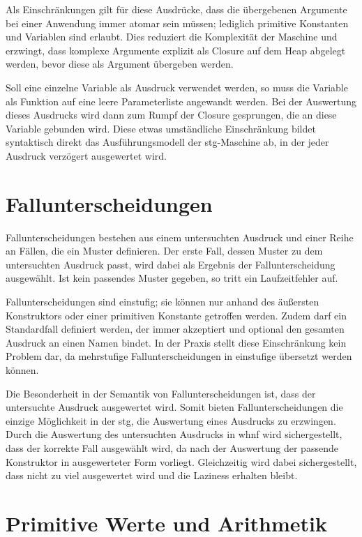 Als Einschränkungen gilt für diese Ausdrücke, dass die übergebenen Argumente bei einer Anwendung immer atomar sein müssen; lediglich primitive Konstanten und Variablen sind erlaubt.
Dies reduziert die Komplexität der Maschine und erzwingt, dass komplexe Argumente explizit als Closure auf dem Heap abgelegt werden, bevor diese als Argument übergeben werden.

Soll eine einzelne Variable als Ausdruck verwendet werden, so muss die Variable als Funktion auf eine leere Parameterliste angewandt werden.
Bei der Auswertung dieses Ausdrucks wird dann zum Rumpf der Closure gesprungen, die an diese Variable gebunden wird.
Diese etwas umständliche Einschränkung bildet syntaktisch direkt das Ausführungsmodell der \gls{stg}-Maschine ab, in der jeder Ausdruck verzögert ausgewertet wird.

\section{Fallunterscheidungen}

Fallunterscheidungen bestehen aus einem untersuchten Ausdruck und einer Reihe an Fällen, die ein Muster definieren.
Der erste Fall, dessen Muster zu dem untersuchten Ausdruck passt, wird dabei als Ergebnis der Fallunterscheidung ausgewählt.
Ist kein passendes Muster gegeben, so tritt ein Laufzeitfehler auf.

Fallunterscheidungen sind einstufig; sie können nur anhand des äußersten Konstruktors oder einer primitiven Konstante getroffen werden.
Zudem darf ein Standardfall definiert werden, der immer akzeptiert und optional den gesamten Ausdruck an einen Namen bindet.
In der Praxis stellt diese Einschränkung kein Problem dar, da mehrstufige Fallunterscheidungen in einstufige übersetzt werden können.

Die Besonderheit in der Semantik von Fallunterscheidungen ist, dass der untersuchte Ausdruck ausgewertet wird.
Somit bieten Fallunterscheidungen die einzige Möglichkeit in der \gls{stg}, die Auswertung eines Ausdrucks zu erzwingen.
Durch die Auswertung des untersuchten Ausdrucks in \gls{whnf} wird sichergestellt, dass der korrekte Fall ausgewählt wird, da nach der Auswertung der passende Konstruktor in ausgewerteter Form vorliegt.
Gleichzeitig wird dabei sichergestellt, dass nicht zu viel ausgewertet wird und die Laziness erhalten bleibt.


\section{Primitive Werte und Arithmetik}


